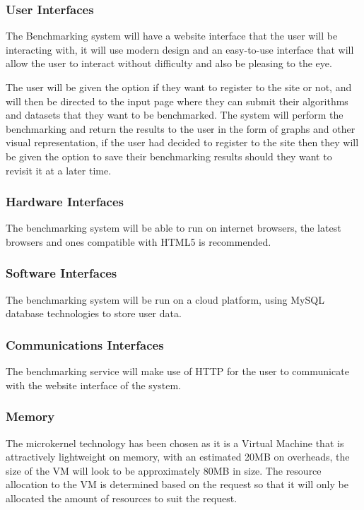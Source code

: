 \documentclass[runningheads,a4paper]{article}
\begin{document}
		\subsubsection{User Interfaces}
			The Benchmarking system will have a website interface that the user will be interacting with, it will use modern design and an easy-to-use interface that will allow the user to interact without difficulty and also be pleasing to the eye. \newline
			
			The user will be given the option if they want to register to the site or not, and will then be directed to the input page where they can submit their algorithms and datasets that they want to be benchmarked. The system will perform the benchmarking and return the results to the user in the form of graphs and other visual representation, if the user had decided to register to the site then they will be given the option to save their benchmarking results should they want to revisit it at a later time. \newline
			
		\subsubsection{Hardware Interfaces}
			The benchmarking system will be able to run on internet browsers, the latest browsers and ones compatible with HTML5 is recommended. \newline
			
		\subsubsection{Software Interfaces}
			The benchmarking system will be run on a cloud platform, using MySQL database technologies to store user data. \newline
			
		\subsubsection{Communications Interfaces}
			The benchmarking service will make use of HTTP for the user to communicate with the website interface of the system. \newline
			
		\subsubsection{Memory}
			The microkernel technology has been chosen as it is a Virtual Machine that is attractively lightweight on memory, with an estimated 20MB on overheads, the size of the VM will look to be approximately 80MB in size. The resource allocation to the VM is determined based on the request so that it will only be allocated the amount of resources to suit the request. \newline
\end{document}
